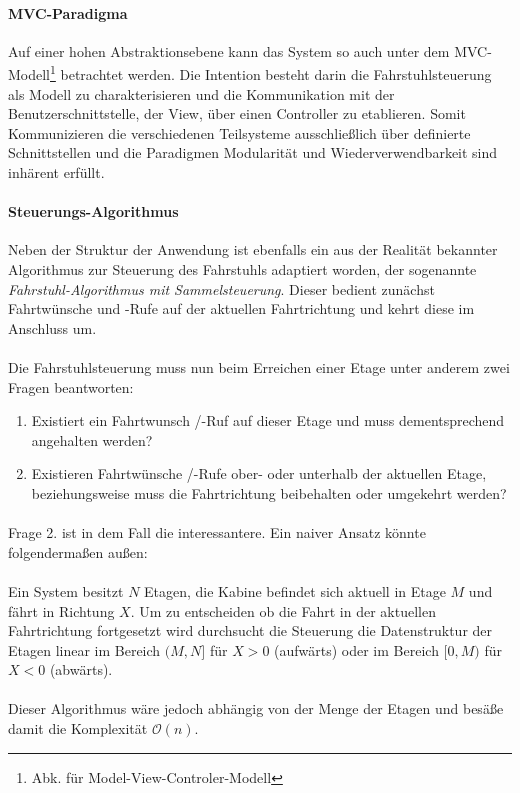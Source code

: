 \paragraph{MVC-Paradigma}Auf einer hohen Abstraktionsebene kann das System so auch unter dem MVC-Modell\footnote{Abk. für Model-View-Controler-Modell } betrachtet werden. Die Intention besteht darin die Fahrstuhlsteuerung als Modell zu charakterisieren und die Kommunikation mit der Benutzerschnittstelle, der View, über einen Controller zu etablieren. Somit Kommunizieren die verschiedenen Teilsysteme ausschließlich über definierte Schnittstellen und die Paradigmen Modularität und Wiederverwendbarkeit sind inhärent erfüllt.

\paragraph{Steuerungs-Algorithmus}Neben der Struktur der Anwendung ist ebenfalls ein aus der Realität bekannter Algorithmus zur Steuerung des Fahrstuhls adaptiert worden, der sogenannte \textit{Fahrstuhl-Algorithmus mit Sammelsteuerung}\cite{wiki_elev}. Dieser bedient zunächst Fahrtwünsche und -Rufe auf der aktuellen Fahrtrichtung und kehrt diese im Anschluss um.

\paragraph{}Die Fahrstuhlsteuerung muss nun beim Erreichen einer Etage unter anderem zwei Fragen beantworten:

\begin{enumerate}
	\item Existiert ein Fahrtwunsch /-Ruf auf dieser Etage und muss dementsprechend angehalten werden?
	\item Existieren Fahrtwünsche /-Rufe ober- oder unterhalb der aktuellen Etage, beziehungsweise muss die Fahrtrichtung beibehalten oder umgekehrt werden?
\end{enumerate}

\paragraph{}Frage 2. ist in dem Fall die interessantere. Ein naiver Ansatz könnte folgendermaßen außen:\\ \\ Ein System besitzt $N$ Etagen, die Kabine befindet sich aktuell in Etage $M$ und fährt in Richtung $X$. Um zu entscheiden ob die Fahrt in der aktuellen Fahrtrichtung fortgesetzt wird durchsucht die Steuerung die Datenstruktur der Etagen linear im Bereich $(M,N]$ für $X>0$ (aufwärts) oder im Bereich $[0,M)$ für $X<0$ (abwärts).\\\\
Dieser Algorithmus wäre jedoch abhängig von der Menge der Etagen und besäße damit die Komplexität $\mathcal{O}(n)$.

